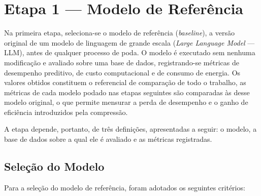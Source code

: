 \section{Etapa 1 --- Modelo de Referência}\label{sec:metodologia_modelo}

Na primeira etapa, seleciona-se o modelo de referência (\textit{baseline}), a versão
original de um modelo de linguagem de grande escala (\textit{Large Language Model} ---
LLM), antes de qualquer processo de poda. O modelo é executado sem nenhuma modificação e
avaliado sobre uma base de dados, registrando-se métricas de desempenho preditivo, de custo
computacional e de consumo de energia. Os valores obtidos constituem o referencial de
comparação de todo o trabalho, as métricas de cada modelo podado nas etapas seguintes são
comparadas às desse modelo original, o que permite mensurar a perda de desempenho e o
ganho de eficiência introduzidos pela compressão.

A etapa depende, portanto, de três definições, apresentadas a seguir: o modelo, a base de dados sobre a qual ele é
avaliado e as métricas registradas.

\subsection{Seleção do Modelo}\label{subsec:metodologia_selecao_modelo}

Para a seleção do modelo de referência, foram adotados os seguintes critérios:

